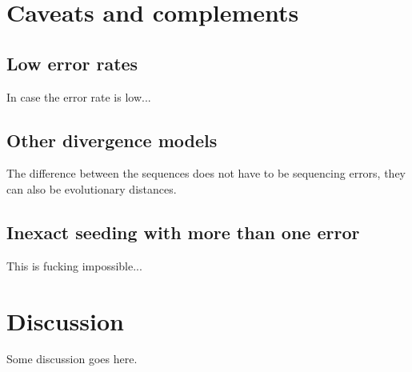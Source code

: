 \documentclass{article}
\begin{document}
\section{Caveats and complements}

\subsection{Low error rates}

In case the error rate is low...

\subsection{Other divergence models}

The difference between the sequences does not have to be sequencing
errors, they can also be evolutionary distances.

\subsection{Inexact seeding with more than one error}

This is fucking impossible...






\section{Discussion}

Some discussion goes here.





\end{document}
